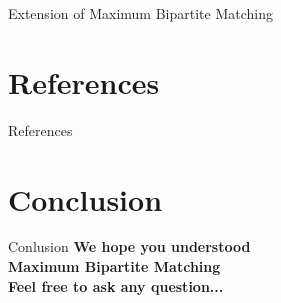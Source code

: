 \documentclass{beamer}
\begin{document}
\begin{frame}{Extension of Maximum Bipartite Matching}
\begin{tikzpicture}
        \end{tikzpicture}
    
    
\end{frame}

\section{References}

\begin{frame}{References}


\end{frame}


\section{Conclusion}
\begin{frame}{Conlusion}
\centering
    \LARGE {{\textbf{We hope you understood \\ \textcolor{jade}{Maximum Bipartite Matching}}}} \\
    \Large {\textcolor{bittersweet}{\textbf{Feel free to ask any question...}}}
\end{frame}
\end{document}
